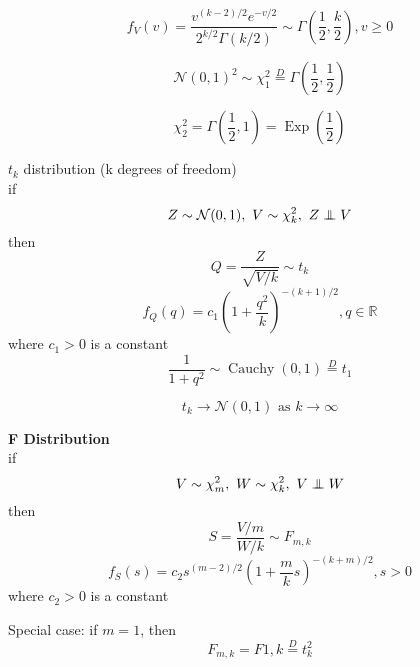 \documentclass[twocolumn]{amsart}
\newcommand{\Exp}{\operatorname{Exp}}
\newcommand{\Cauchy}{\operatorname{Cauchy}}
\newcommand\independent{\protect\mathpalette{\protect\independenT}{\perp}}
\def\independenT#1#2{\mathrel{\rlap{$#1#2$}\mkern3mu{#1#2}}}
\begin{document}
\begin{equation*}
  f_{V}(v) = \frac{v^{(k-2)/2}e^{-v/2}}{2^{k/2}\Gamma(k/2)} \sim
  \Gamma\left(\frac{1}{2},\frac{k}{2}\right), v \geq 0
\end{equation*}

\begin{equation*}
  \mathcal{N}(0,1)^{2} \sim \chi_{1}^{2} \stackrel{D}{=} \Gamma\left(\frac{1}{2},\frac{1}{2}\right)
\end{equation*}

\begin{equation*}
  \chi_{2}^{2} = \Gamma\left(\frac{1}{2},1\right) = \Exp\left(\frac{1}{2}\right)
\end{equation*}

$t_{k}$ distribution (k degrees of freedom)\\
if
\begin{equation*}
  Z \sim \mathcal{N}(0, 1),~V \sim \chi_{k}^{2},~Z \independent V
\end{equation*}
then
\begin{equation*}
  Q = \frac{Z}{\sqrt{V/k}} \sim t_{k}
\end{equation*}
\begin{equation*}
  f_{Q}(q) = c_{1}{(1+\frac{q^{2}}{k})}^{-(k+1)/2}, q \in \mathbb{R}
\end{equation*}
where \(c_{1}>0\) is a constant
\begin{equation*}
  \frac{1}{1 + q^{2}} \sim \Cauchy(0,1) \stackrel{D}{=} t_{1}
\end{equation*}

\begin{equation*}
  t_{k} \to \mathcal{N}(0,1) \text{ as } k\to\infty
\end{equation*}

\textbf{F Distribution} \\
if
\begin{equation*}
  V \sim \chi^{2}_{m},~W \sim \chi^{2}_{k},~V \independent W
\end{equation*}
then
\begin{equation*}
  S = \frac{V/m}{W/k} \sim F_{m,k}
\end{equation*}
\begin{equation*}
  f_{S}(s) = c_{2}s^{(m-2)/2}(1+\frac{m}{k}s)^{-(k+m)/2},s>0
\end{equation*}
where $c_{2} > 0$ is a constant

Special case:
if \(m=1\), then
\begin{equation*}
  F_{m,k}=F{1,k} \stackrel{D}{=} t^{2}_{k}
\end{equation*}
\end{document}
